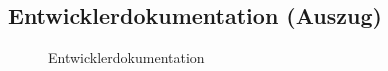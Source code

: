 \subsection{Entwicklerdokumentation (Auszug)}
\label{app:Doc}
\begin{figure}[htb]
\centering
{}
\caption{Entwicklerdokumentation}
\end{figure}

    